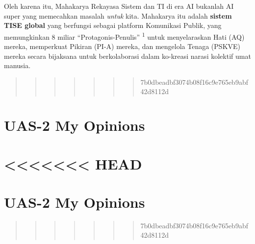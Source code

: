 \documentclass[
  letterpaper,
  DIV=11,
  numbers=noendperiod]{scrreprt}
\begin{document}
Oleh karena itu, Mahakarya Rekayasa Sistem dan TI di era AI bukanlah AI
super yang memecahkan masalah \emph{untuk} kita. Mahakarya itu adalah
\textbf{sistem TISE global} yang berfungsi sebagai platform Komunikasi
Publik, yang memungkinkan 8 miliar ``Protagonis-Penulis''
\textsuperscript{1} untuk menyelaraskan Hati (AQ) mereka, memperkuat
Pikiran (PI-A) mereka, dan mengelola Tenaga (PSKVE) mereka secara
bijaksana untuk berkolaborasi dalam ko-kreasi narasi kolektif umat
manusia.

\begin{quote}
\begin{quote}
\begin{quote}
\begin{quote}
\begin{quote}
\begin{quote}
\begin{quote}
7b0dbeadbf3074b08f16c9e765eb9abf42d8112d
\end{quote}
\end{quote}
\end{quote}
\end{quote}
\end{quote}
\end{quote}
\end{quote}


\chapter{UAS-2 My Opinions}\label{uas-2-my-opinions}


\chapter{\textless\textless\textless\textless\textless\textless\textless{}
HEAD}\label{head}


\chapter{UAS-2 My Opinions}\label{uas-2-my-opinions-1}

\begin{quote}
\begin{quote}
\begin{quote}
\begin{quote}
\begin{quote}
\begin{quote}
\begin{quote}
7b0dbeadbf3074b08f16c9e765eb9abf42d8112d
\end{quote}
\end{quote}
\end{quote}
\end{quote}
\end{quote}
\end{quote}
\end{quote}
\end{document}
